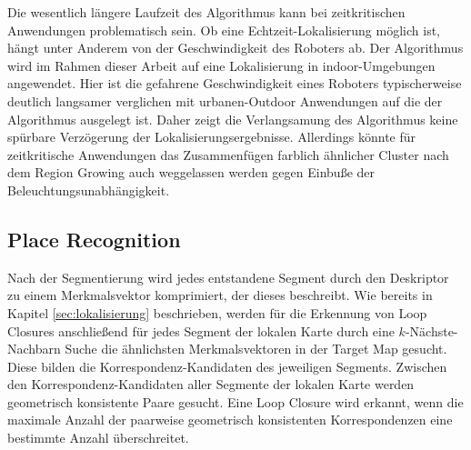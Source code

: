 Die wesentlich längere Laufzeit des Algorithmus kann bei zeitkritischen Anwendungen problematisch sein. Ob eine Echtzeit-Lokalisierung möglich ist, hängt unter Anderem von der Geschwindigkeit des Roboters ab. Der Algorithmus wird im Rahmen dieser Arbeit auf eine Lokalisierung in indoor-Umgebungen angewendet. Hier ist die gefahrene Geschwindigkeit eines Roboters typischerweise deutlich langsamer verglichen mit urbanen-Outdoor Anwendungen auf die der Algorithmus ausgelegt ist. Daher zeigt die Verlangsamung des Algorithmus keine spürbare Verzögerung der \linebreak Lokalisierungsergebnisse. Allerdings könnte für zeitkritische Anwendungen das Zusammenfügen farblich ähnlicher Cluster nach dem Region Growing auch weggelassen werden gegen Einbuße der Beleuchtungsunabhängigkeit.



\subsection{Place Recognition}
\label{sec:Place Recognition}

Nach der Segmentierung wird jedes entstandene Segment durch den Deskriptor zu einem Merkmalsvektor komprimiert, der dieses beschreibt. Wie bereits in Kapitel \ref{sec:lokalisierung} beschrieben, werden für die Erkennung von Loop Closures anschließend für jedes Segment der lokalen Karte durch eine $k$-Nächste-Nachbarn Suche die ähnlichsten Merkmalsvektoren in der Target Map gesucht. Diese bilden die Korrespondenz-Kandidaten des jeweiligen Segments. Zwischen den Korrespondenz-Kandidaten aller Segmente der lokalen Karte werden geometrisch konsistente Paare gesucht. Eine Loop Closure wird erkannt, wenn die maximale Anzahl der paarweise geometrisch konsistenten Korrespondenzen eine bestimmte Anzahl überschreitet. 

